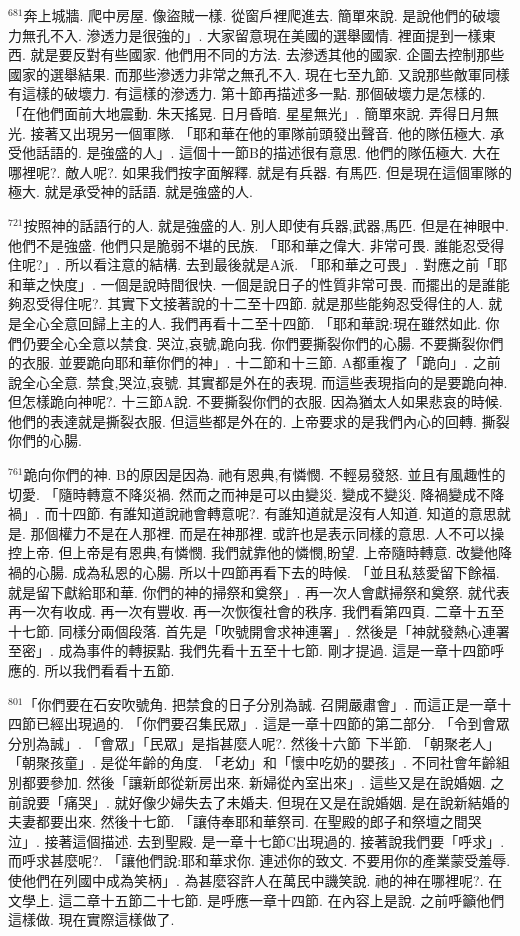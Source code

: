 \documentclass{book}
\begin{document}
$^{681}$奔上城牆.
爬中房屋.
像盜賊一樣.
從窗戶裡爬進去.
簡單來說.
是說他們的破壞力無孔不入.
滲透力是很強的」.
大家留意現在美國的選舉國情.
裡面提到一樣東西.
就是要反對有些國家.
他們用不同的方法.
去滲透其他的國家.
企圖去控制那些國家的選舉結果.
而那些滲透力非常之無孔不入.
現在七至九節.
又說那些敵軍同樣有這樣的破壞力.
有這樣的滲透力.
第十節再描述多一點.
那個破壞力是怎樣的.
「在他們面前大地震動.
朱天搖晃.
日月昏暗.
星星無光」.
簡單來說.
弄得日月無光.
接著又出現另一個軍隊.
「耶和華在他的軍隊前頭發出聲音.
他的隊伍極大.
承受他話語的.
是強盛的人」.
這個十一節B的描述很有意思.
他們的隊伍極大.
大在哪裡呢?.
敵人呢?.
如果我們按字面解釋.
就是有兵器.
有馬匹.
但是現在這個軍隊的極大.
就是承受神的話語.
就是強盛的人.

$^{721}$按照神的話語行的人.
就是強盛的人.
別人即使有兵器,武器,馬匹.
但是在神眼中.
他們不是強盛.
他們只是脆弱不堪的民族.
「耶和華之偉大.
非常可畏.
誰能忍受得住呢?」.
所以看注意的結構.
去到最後就是A派.
「耶和華之可畏」.
對應之前「耶和華之快度」.
一個是說時間很快.
一個是說日子的性質非常可畏.
而擺出的是誰能夠忍受得住呢?.
其實下文接著說的十二至十四節.
就是那些能夠忍受得住的人.
就是全心全意回歸上主的人.
我們再看十二至十四節.
「耶和華說:現在雖然如此.
你們仍要全心全意以禁食.
哭泣,哀號,跪向我.
你們要撕裂你們的心腸.
不要撕裂你們的衣服.
並要跪向耶和華你們的神」.
十二節和十三節.
A都重複了「跪向」.
之前說全心全意.
禁食,哭泣,哀號.
其實都是外在的表現.
而這些表現指向的是要跪向神.
但怎樣跪向神呢?.
十三節A說.
不要撕裂你們的衣服.
因為猶太人如果悲哀的時候.
他們的表達就是撕裂衣服.
但這些都是外在的.
上帝要求的是我們內心的回轉.
撕裂你們的心腸.

$^{761}$跪向你們的神.
B的原因是因為.
祂有恩典,有憐憫.
不輕易發怒.
並且有風趣性的切愛.
「隨時轉意不降災禍.
然而之而神是可以由變災.
變成不變災.
降禍變成不降禍」.
而十四節.
有誰知道說祂會轉意呢?.
有誰知道就是沒有人知道.
知道的意思就是.
那個權力不是在人那裡.
而是在神那裡.
或許也是表示同樣的意思.
人不可以操控上帝.
但上帝是有恩典,有憐憫.
我們就靠他的憐憫,盼望.
上帝隨時轉意.
改變他降禍的心腸.
成為私恩的心腸.
所以十四節再看下去的時候.
「並且私慈愛留下餘福.
就是留下獻給耶和華.
你們的神的掃祭和奠祭」.
再一次人會獻掃祭和奠祭.
就代表再一次有收成.
再一次有豐收.
再一次恢復社會的秩序.
我們看第四頁.
二章十五至十七節.
同樣分兩個段落.
首先是「吹號開會求神連署」.
然後是「神就發熱心連署至密」.
成為事件的轉捩點.
我們先看十五至十七節.
剛才提過.
這是一章十四節呼應的.
所以我們看看十五節.

$^{801}$「你們要在石安吹號角.
把禁食的日子分別為誠.
召開嚴肅會」.
而這正是一章十四節已經出現過的.
「你們要召集民眾」.
這是一章十四節的第二部分.
「令到會眾分別為誠」.
「會眾」「民眾」是指甚麼人呢?.
然後十六節 下半節.
「朝聚老人」「朝聚孩童」.
是從年齡的角度.
「老幼」和「懷中吃奶的嬰孩」.
不同社會年齡組別都要參加.
然後「讓新郎從新房出來.
新婦從內室出來」.
這些又是在說婚姻.
之前說要「痛哭」.
就好像少婦失去了未婚夫.
但現在又是在說婚姻.
是在說新結婚的夫妻都要出來.
然後十七節.
「讓侍奉耶和華祭司.
在聖殿的郎子和祭壇之間哭泣」.
接著這個描述.
去到聖殿.
是一章十七節C出現過的.
接著說我們要「呼求」.
而呼求甚麼呢?.
「讓他們說:耶和華求你.
連述你的致文.
不要用你的產業蒙受羞辱.
使他們在列國中成為笑柄」.
為甚麼容許人在萬民中譏笑說.
祂的神在哪裡呢?.
在文學上.
這二章十五節二十七節.
是呼應一章十四節.
在內容上是說.
之前呼籲他們這樣做.
現在實際這樣做了.
\end{document}
